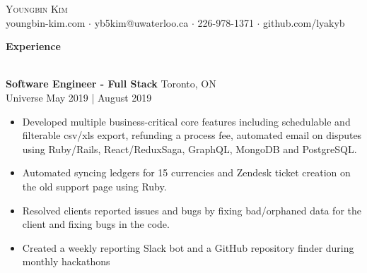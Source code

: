 \documentclass[a4paper]{article}
\newcommand{\lineunder} {
    \vspace{-8pt} \\
    \hspace{-18pt} \hrulefill \\
}
\newcommand{\header} [1] {
    {\hspace{-18pt}\vspace*{6pt} \textcolor{headerGray}{\textbf{\large{#1}}}}
    \vspace{-6pt} \lineunder
}
\begin{document}
\raggedright
\vspace{-12cm}

    

\begin{center}
	{\Huge \scshape {Youngbin Kim}}\\
	youngbin-kim.com $\cdot$ yb5kim@uwaterloo.ca $\cdot$ 226-978-1371 $\cdot$ github.com/lyakyb\\
\end{center}

\vspace{3mm}
\header{Experience}
\vspace{1mm}

\textbf{\normalsize Software Engineer - Full Stack} \hfill Toronto, ON\\
\textcolor{jobGray}{Universe} \hfill \textcolor{dateGray}{May 2019 | August 2019}\\
\vspace{-2mm}
\begin{itemize}[leftmargin=* ] \itemsep -0.5pt
	\item Developed multiple business-critical core features including schedulable and filterable csv/xls export, refunding a process fee, automated email on disputes using Ruby/Rails, React/ReduxSaga, GraphQL, MongoDB and PostgreSQL.  
	\item Automated syncing ledgers for 15 currencies and Zendesk ticket creation on the old support page using Ruby.
	\item Resolved clients reported issues and bugs by fixing bad/orphaned data for the client and fixing bugs in the code.
	\item Created a weekly reporting Slack bot and a GitHub repository finder during monthly hackathons	
\end{itemize}
\vspace{2mm}
\end{document}
